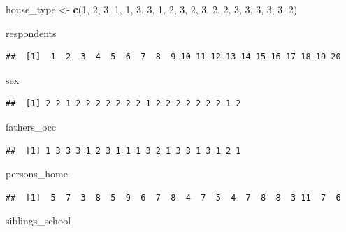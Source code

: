 \documentclass[
]{article}
\newenvironment{Shaded}{\begin{snugshade}}{\end{snugshade}}
\newcommand{\DecValTok}[1]{\textcolor[rgb]{0.00,0.00,0.81}{#1}}
\newcommand{\FunctionTok}[1]{\textcolor[rgb]{0.13,0.29,0.53}{\textbf{#1}}}
\newcommand{\NormalTok}[1]{#1}
\newcommand{\OtherTok}[1]{\textcolor[rgb]{0.56,0.35,0.01}{#1}}
\begin{document}
\begin{Shaded}
\begin{Highlighting}[]
\NormalTok{house\_type }\OtherTok{\textless{}{-}} \FunctionTok{c}\NormalTok{(}\DecValTok{1}\NormalTok{, }\DecValTok{2}\NormalTok{, }\DecValTok{3}\NormalTok{, }\DecValTok{1}\NormalTok{, }\DecValTok{1}\NormalTok{, }\DecValTok{3}\NormalTok{, }\DecValTok{3}\NormalTok{, }\DecValTok{1}\NormalTok{, }\DecValTok{2}\NormalTok{, }\DecValTok{3}\NormalTok{, }\DecValTok{2}\NormalTok{, }\DecValTok{3}\NormalTok{, }\DecValTok{2}\NormalTok{, }\DecValTok{2}\NormalTok{, }\DecValTok{3}\NormalTok{, }\DecValTok{3}\NormalTok{, }\DecValTok{3}\NormalTok{, }\DecValTok{3}\NormalTok{, }\DecValTok{3}\NormalTok{, }\DecValTok{2}\NormalTok{)}

\NormalTok{respondents}
\end{Highlighting}
\end{Shaded}

\begin{verbatim}
##  [1]  1  2  3  4  5  6  7  8  9 10 11 12 13 14 15 16 17 18 19 20
\end{verbatim}

\begin{Shaded}
\begin{Highlighting}[]
\NormalTok{sex}
\end{Highlighting}
\end{Shaded}

\begin{verbatim}
##  [1] 2 2 1 2 2 2 2 2 2 2 1 2 2 2 2 2 2 2 1 2
\end{verbatim}

\begin{Shaded}
\begin{Highlighting}[]
\NormalTok{fathers\_occ}
\end{Highlighting}
\end{Shaded}

\begin{verbatim}
##  [1] 1 3 3 3 1 2 3 1 1 1 3 2 1 3 3 1 3 1 2 1
\end{verbatim}

\begin{Shaded}
\begin{Highlighting}[]
\NormalTok{persons\_home}
\end{Highlighting}
\end{Shaded}

\begin{verbatim}
##  [1]  5  7  3  8  5  9  6  7  8  4  7  5  4  7  8  8  3 11  7  6
\end{verbatim}

\begin{Shaded}
\begin{Highlighting}[]
\NormalTok{siblings\_school}
\end{Highlighting}
\end{Shaded}
\end{document}
